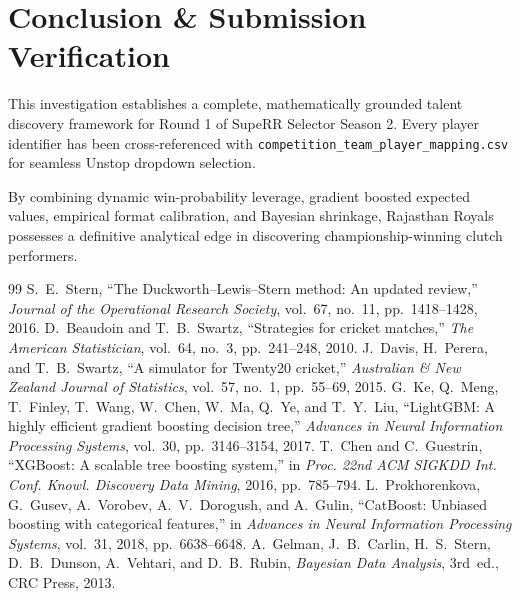 \documentclass[11pt,a4paper]{article}
\begin{document}
\section{Conclusion \& Submission Verification}
This investigation establishes a complete, mathematically grounded talent discovery framework for Round 1 of SupeRR Selector Season 2. Every player identifier has been cross-referenced with \texttt{competition\_team\_player\_mapping.csv} for seamless Unstop dropdown selection.

By combining dynamic win-probability leverage, gradient boosted expected values, empirical format calibration, and Bayesian shrinkage, Rajasthan Royals possesses a definitive analytical edge in discovering championship-winning clutch performers.

\begin{thebibliography}{99}
S.~E.~Stern, ``The Duckworth--Lewis--Stern method: An updated review,'' \emph{Journal of the Operational Research Society}, vol.~67, no.~11, pp.~1418--1428, 2016.
D.~Beaudoin and T.~B.~Swartz, ``Strategies for cricket matches,'' \emph{The American Statistician}, vol.~64, no.~3, pp.~241--248, 2010.
J.~Davis, H.~Perera, and T.~B.~Swartz, ``A simulator for Twenty20 cricket,'' \emph{Australian \& New Zealand Journal of Statistics}, vol.~57, no.~1, pp.~55--69, 2015.
G.~Ke, Q.~Meng, T.~Finley, T.~Wang, W.~Chen, W.~Ma, Q.~Ye, and T.~Y.~Liu, ``LightGBM: A highly efficient gradient boosting decision tree,'' \emph{Advances in Neural Information Processing Systems}, vol.~30, pp.~3146--3154, 2017.
T.~Chen and C.~Guestrin, ``XGBoost: A scalable tree boosting system,'' in \emph{Proc. 22nd ACM SIGKDD Int. Conf. Knowl. Discovery Data Mining}, 2016, pp.~785--794.
L.~Prokhorenkova, G.~Gusev, A.~Vorobev, A.~V.~Dorogush, and A.~Gulin, ``CatBoost: Unbiased boosting with categorical features,'' in \emph{Advances in Neural Information Processing Systems}, vol.~31, 2018, pp.~6638--6648.
A.~Gelman, J.~B.~Carlin, H.~S.~Stern, D.~B.~Dunson, A.~Vehtari, and D.~B.~Rubin, \emph{Bayesian Data Analysis}, 3rd~ed., CRC Press, 2013.
\end{thebibliography}
\end{document}
